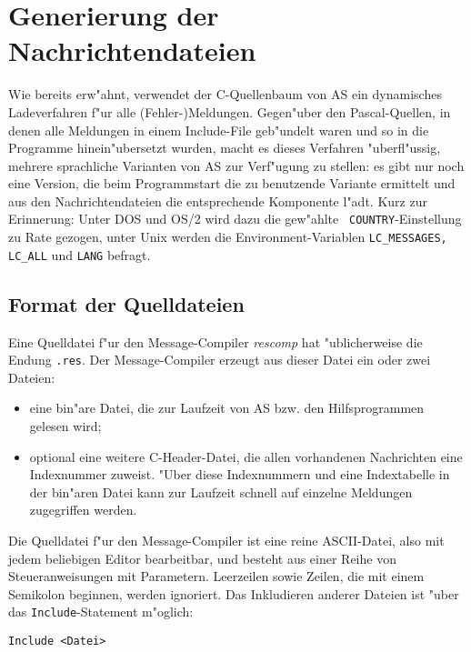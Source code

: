 \documentclass[12pt,a4paper,twoside]{report}
\begin{document}
\section{Generierung der Nachrichtendateien}

Wie bereits erw"ahnt, verwendet der C-Quellenbaum von AS ein dynamisches
Ladeverfahren f"ur alle (Fehler-)Meldungen.  Gegen"uber den
Pascal-Quellen, in denen alle Meldungen in einem Include-File geb"undelt
waren und so in die Programme hinein"ubersetzt wurden, macht es dieses
Verfahren "uberfl"ussig, mehrere sprachliche Varianten von AS zur
Verf"ugung zu stellen: es gibt nur noch eine Version, die beim
Programmstart die zu benutzende Variante ermittelt und aus den
Nachrichtendateien die entsprechende Komponente l"adt.  Kurz zur
Erinnerung: Unter DOS und OS/2 wird dazu die gew"ahlte {\tt
COUNTRY}-Einstellung zu Rate gezogen, unter Unix werden die
Environment-Variablen {\tt LC\_MESSAGES, LC\_ALL} und {\tt LANG} befragt.

\subsection{Format der Quelldateien}

Eine Quelldatei f"ur den Message-Compiler {\em rescomp} hat "ublicherweise
die Endung {\tt .res}.  Der Message-Compiler erzeugt aus dieser Datei ein
oder zwei Dateien:
\begin{itemize}
\item{eine bin"are Datei, die zur Laufzeit von AS bzw. den Hilfsprogrammen
      gelesen wird;}
\item{optional eine weitere C-Header-Datei, die allen vorhandenen
      Nachrichten eine Indexnummer zuweist.  "Uber diese Indexnummern und
      eine Indextabelle in der bin"aren Datei kann zur Laufzeit schnell
      auf einzelne Meldungen zugegriffen werden.}
\end{itemize}

Die Quelldatei f"ur den Message-Compiler ist eine reine ASCII-Datei, also
mit jedem beliebigen Editor bearbeitbar, und besteht aus einer Reihe von
Steueranweisungen mit Parametern.  Leerzeilen sowie Zeilen, die mit einem
Semikolon beginnen, werden ignoriert.  Das Inkludieren anderer Dateien ist
"uber das {\tt Include}-Statement m"oglich:
\begin{verbatim}
Include <Datei>
\end{verbatim}
\end{document}
